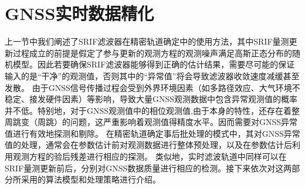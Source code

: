 \section{GNSS实时数据精化}
上一节中我们阐述了SRIF滤波器在精密轨道确定中的使用方法，其中SRIF量测更新过程成立的前提是假定了参与更新的观测方程的观测噪声满足高斯正态分布的随机模型。因此若要确保SRIF滤波器能够得到正确的估计结果，需要尽可能的保证输入的是“干净”的观测值，否则其中的“异常值”将会导致滤波器收敛速度减缓甚至发散。
由于GNSS信号传播过程会受到外界环境因素（如多路径效应、大气环境不稳定、接发硬件因素）等影响，导致大量GNSS观测数据中包含异常观测值的概率并不低。特别地，对于GNSS观测值中的相位观测值,由于本身的特性，还存在着整周跳变（周跳）的问题，这严重影响着观测值得精度水平。因而需要对GNSS异常值进行有效地探测和剔除。
在精密轨道确定事后批处理的模式中，其对GNSS异常值的处理，通常会在参数估计前对观测数据进行整体预处理，以及在参数估计后利用观测方程的验后残差进行相应的探测。
类似地，实时滤波轨道中同样可以在SRIF量测更新前后，分别对GNSS数据质量进行相应的检测。接下来依次对这两部分所采用的算法模型和处理策略进行介绍。

